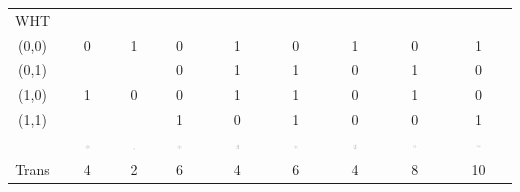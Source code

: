 \begin{table}
\begin{tabular}{|c|c|c|c|c|c|c|c|c|}
			\hline
				WHT & & & & & & & &\\
				(0,0) & 0 & 1 & 0 & 1 & 0 & 1 & 0 & 1\\
				(0,1) &   &   & 0 & 1 & 1 & 0 & 1 & 0\\
				(1,0) & 1 & 0 & 0 & 1 & 1 & 0 & 1 & 0\\
				(1,1) &   &   & 1 & 0 & 1 & 0 & 0 & 1\\
			\hline
				& 
				\includegraphics[width=0.1\textwidth]{pics/gates_schematic/buffer} & 
				\includegraphics[width=0.08\textwidth]{pics/gates_schematic/inverter} & 
				\includegraphics[width=0.1\textwidth]{pics/gates_schematic/and} &
				\includegraphics[width=0.1\textwidth]{pics/gates_schematic/nand} &
				\includegraphics[width=0.1\textwidth]{pics/gates_schematic/or} &
				\includegraphics[width=0.1\textwidth]{pics/gates_schematic/nor} & 
				\includegraphics[width=0.1\textwidth]{pics/gates_schematic/xor} & 
				\includegraphics[width=0.1\textwidth]{pics/gates_schematic/xnor} \\
			\hline
				Trans & 4 & 2 & 6 & 4 & 6 & 4 & 8 & 10\\
			\hline
		\end{tabular}
\end{table}